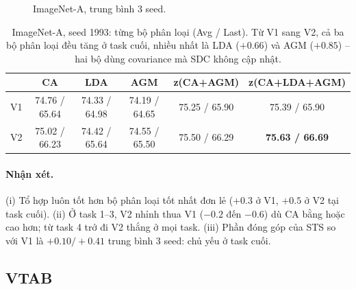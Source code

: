 \documentclass[11pt]{article}
\begin{document}
\begin{figure}[H]
\centering
{}
\caption{ImageNet-A, trung bình 3 seed.}
\end{figure}

\begin{table}[H]
\centering\small
\caption{ImageNet-A, seed 1993: từng bộ phân loại (Avg / Last). Từ V1 sang V2, cả ba bộ phân loại đều tăng ở task
cuối, nhiều nhất là LDA ($+0.66$) và AGM ($+0.85$) -- hai bộ dùng covariance mà SDC không cập nhật.}
\label{tab:heads}
\begin{tabular}{lccccc}
\toprule
 & CA & LDA & AGM & z(CA+AGM) & z(CA+LDA+AGM) \\
\midrule
V1 & 74.76 / 65.64 & 74.33 / 64.98 & 74.19 / 64.65 & 75.25 / 65.90 & 75.39 / 65.90 \\
V2 & 75.02 / 66.23 & 74.42 / 65.64 & 74.55 / 65.50 & 75.50 / 66.29 & \textbf{75.63 / 66.69} \\
\bottomrule
\end{tabular}
\end{table}

\paragraph{Nhận xét.} (i) Tổ hợp luôn tốt hơn bộ phân loại tốt nhất đơn lẻ ($+0.3$ ở V1, $+0.5$ ở V2 tại task cuối). (ii) Ở
task 1--3, V2 nhỉnh thua V1 ($-0.2$ đến $-0.6$) dù CA bằng hoặc cao hơn; từ task 4 trở đi V2 thắng ở mọi task.
(iii) Phần đóng góp của STS so với V1 là $+0.10/+0.41$ trung bình 3 seed: chủ yếu ở task cuối.

\subsection{VTAB}
\end{document}
